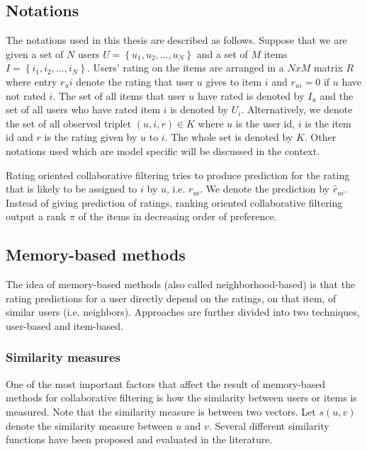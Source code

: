 \documentclass[oneside,13pt]{extreport}
\begin{document}
\subsection{Notations}
The notations used in this thesis are described as follows. Suppose that we are given
a set of $N$ users $U = \left\{ {{u_1},{u_2},...,{u_N}} \right\}$ and a set of $M$ items $I = \left\{ {{i_1},{i_2},...,{i_N}} \right\}$. Users’ rating on the items are arranged in a $NxM$ matrix $R$ where entry $r_ui$ denote the rating that user $u$ gives to item
$i$ and $r_{ui} = 0$ if $u$ have not rated $i$. The set of all items that user $u$
have rated is denoted by $I_u$ and the set of all users who have rated item $i$ is denoted by $U_i$. Alternatively, we denote the set of all observed
triplet $\left( {u,i,r} \right) \in K$  where $u$ is the user id, $i$ is the item id
and $r$ is the rating given by $u$ to $i$. The whole set is denoted by $K$.
Other notations used which are model specific will be discussed in the context. 

Rating oriented collaborative filtering tries to produce prediction for the rating that is likely to be assigned to $i$ by $u$, i.e. $r_{ui}$. We denote the prediction by $\hat r_{ui}$. Instead of giving prediction of ratings, ranking oriented collaborative
filtering output a rank $\pi$ of the items in decreasing order
of preference.
\subsection{Memory-based methods}
The idea of memory-based methods (also called neighborhood-based) is that the rating predictions for a user directly depend on the ratings, on that item, of similar users (i.e. neighbors).  Approaches are further divided into two techniques, user-based and item-based.

\subsubsection{Similarity measures}
One of the most important factors that affect the result of memory-based methods for collaborative filtering is how the similarity between
users or items is measured. Note that the similarity measure is between two vectors. Let $s(u,v)$ denote the similarity measure between $u$ and $v$. Several different similarity functions have been proposed and evaluated in the literature.
\end{document}
